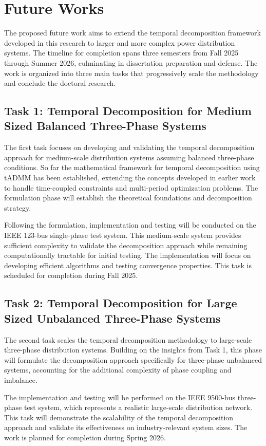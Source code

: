\section{Future Works}\label{sec:future_Work}
The proposed future work aims to extend the temporal decomposition framework developed in this research to larger and more complex power distribution systems. The timeline for completion spans three semesters from Fall 2025 through Summer 2026, culminating in dissertation preparation and defense. The work is organized into three main tasks that progressively scale the methodology and conclude the doctoral research.

\subsection{Task 1: Temporal Decomposition for Medium Sized Balanced Three-Phase Systems}
The first task focuses on developing and validating the temporal decomposition approach for medium-scale distribution systems assuming balanced three-phase conditions. So far the mathematical framework for temporal decomposition using tADMM has been established, extending the concepts developed in earlier work to handle time-coupled constraints and multi-period optimization problems. The formulation phase will establish the theoretical foundations and decomposition strategy.

Following the formulation, implementation and testing will be conducted on the IEEE 123-bus single-phase test system. This medium-scale system provides sufficient complexity to validate the decomposition approach while remaining computationally tractable for initial testing. The implementation will focus on developing efficient algorithms and testing convergence properties. This task is scheduled for completion during Fall 2025.

\subsection{Task 2: Temporal Decomposition for Large Sized Unbalanced Three-Phase Systems}
The second task scales the temporal decomposition methodology to large-scale three-phase distribution systems. Building on the insights from Task 1, this phase will formulate the decomposition approach specifically for three-phase unbalanced systems, accounting for the additional complexity of phase coupling and imbalance.

The implementation and testing will be performed on the IEEE 9500-bus three-phase test system, which represents a realistic large-scale distribution network. This task will demonstrate the scalability of the temporal decomposition approach and validate its effectiveness on industry-relevant system sizes. The work is planned for completion during Spring 2026.

